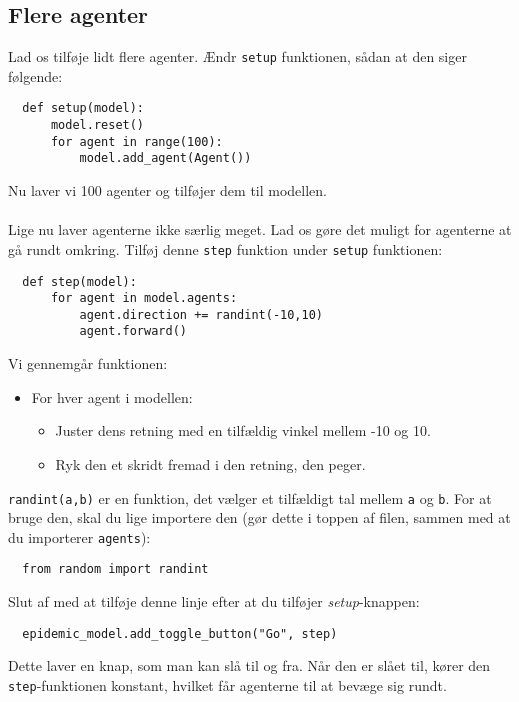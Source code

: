 \documentclass{article}
\begin{document}
\subsection{Flere agenter}
Lad os tilføje lidt flere agenter. Ændr \texttt{setup} funktionen, sådan at den siger følgende:
\begin{lstlisting}
  def setup(model):
      model.reset()
      for agent in range(100):
          model.add_agent(Agent())
\end{lstlisting}
Nu laver vi 100 agenter og tilføjer dem til modellen.\\\\
Lige nu laver agenterne ikke særlig meget. Lad os gøre det muligt for agenterne at gå rundt omkring. Tilføj denne \texttt{step} funktion under \texttt{setup} funktionen:
\begin{lstlisting}
  def step(model):
      for agent in model.agents:
          agent.direction += randint(-10,10)
          agent.forward()
\end{lstlisting}
Vi gennemgår funktionen:
\begin{itemize}
\item For hver agent i modellen:
  \begin{itemize}
  \item Juster dens retning med en tilfældig vinkel mellem -10 og 10.
  \item Ryk den et skridt fremad i den retning, den peger.
  \end{itemize}
\end{itemize}
\texttt{randint(a,b)} er en funktion, det vælger et tilfældigt tal mellem \texttt{a} og \texttt{b}. For at bruge den, skal du lige importere den (gør dette i toppen af filen, sammen med at du importerer \texttt{agents}):
\begin{lstlisting}
  from random import randint
\end{lstlisting}
Slut af med at tilføje denne linje efter at du tilføjer \textit{setup}-knappen:
\begin{lstlisting}
  epidemic_model.add_toggle_button("Go", step)
\end{lstlisting}
Dette laver en knap, som man kan slå til og fra. Når den er slået til, kører den \texttt{step}-funktionen konstant, hvilket får agenterne til at bevæge sig rundt.
\end{document}
